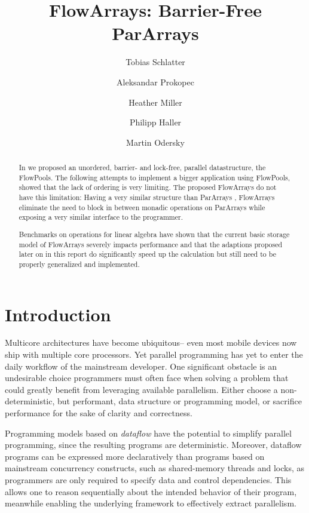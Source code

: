 \documentclass[runningheads,a4paper,fleqn]{llncs}
\begin{document}
\title{FlowArrays: Barrier-Free ParArrays}
\author{Tobias Schlatter \and Aleksandar Prokopec \and
  Heather Miller \and Philipp Haller \and Martin
  Odersky}



\graphicspath{{figs/}}

\newcommand{\plot}[1]{}

\maketitle

\begin{abstract}
  In \cite{FP12} we proposed an unordered, barrier- and lock-free,
  parallel datastructure, the FlowPools. The following attempts to
  implement a bigger application using FlowPools, showed that the lack
  of ordering is very limiting. The proposed FlowArrays do not have
  this limitation: Having a very similar structure than ParArrays
  \cite{collect11}, FlowArrays eliminate the need to block in between
  monadic operations on ParArrays while exposing a very similar
  interface to the programmer.

  Benchmarks on operations for linear algebra have shown that the
  current basic storage model of FlowArrays severely impacts
  performance and that the adaptions proposed later on in this report
  do significantly speed up the calculation but still need to be
  properly generalized and implemented.
\end{abstract}

\section{Introduction}
Multicore architectures have become ubiquitous-- even most mobile devices now
ship with multiple core processors. Yet parallel programming has yet to enter
the daily workflow of the mainstream developer. One significant obstacle is an
undesirable choice programmers must often face when solving a problem that
could greatly benefit from leveraging available parallelism. Either choose a
non-deterministic, but performant, data structure or programming model, or
sacrifice performance for the sake of clarity and correctness.

Programming models based on \emph{dataflow} \cite{Arvind89,CnC10} have the
potential to simplify parallel programming, since the resulting programs are
deterministic. Moreover, dataflow programs can be expressed more declaratively
than programs based on mainstream concurrency constructs, such as shared-memory 
threads and locks, as programmers are only required to specify data and
control dependencies. This allows one to reason sequentially about the
intended behavior of their program, meanwhile enabling the underlying
framework to effectively extract parallelism.
\end{document}

